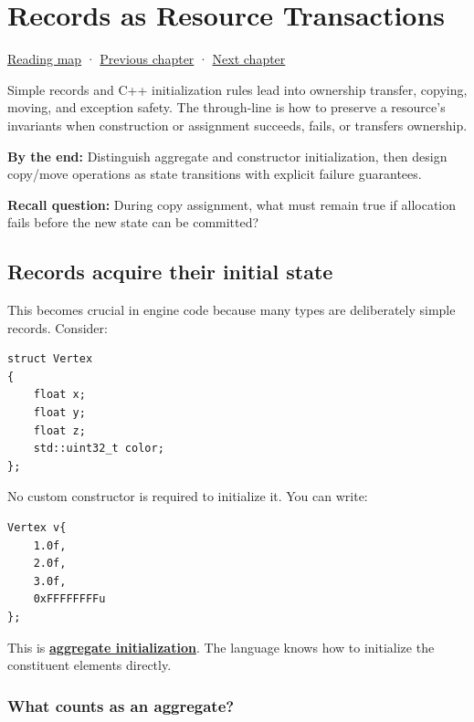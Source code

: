 \hypertarget{01-foundations-i-ch003}{}
\chapter{Records as Resource Transactions}\label{stagechapter:01-foundations-i-ch003}\label{01-foundations-i-ch003-records-as-resource-transactions}

\hyperref[volume-reading-map]{Reading map} · \hyperref[01-foundations-i-ch002-values-at-addresses-layout-lifetimes-and-representation]{Previous chapter} · \hyperref[01-foundations-i-ch004-prove-c-ownership-with-runnable-experiments]{Next chapter}

Simple records and C++ initialization rules lead into ownership transfer, copying, moving, and exception safety. The through-line is how to preserve a resource's invariants when construction or assignment succeeds, fails, or transfers ownership.

\textbf{By the end:} Distinguish aggregate and constructor initialization, then design copy/move operations as state transitions with explicit failure guarantees.

\textbf{Recall question:} During copy assignment, what must remain true if allocation fails before the new state can be committed?

\section{Records acquire their initial state}\label{01-foundations-i-ch003-records-acquire-their-initial-state}

This becomes crucial in engine code because many types are deliberately simple records. Consider:

\begin{verbatim}
struct Vertex
{
    float x;
    float y;
    float z;
    std::uint32_t color;
};
\end{verbatim}

No custom constructor is required to initialize it. You can write:

\begin{verbatim}
Vertex v{
    1.0f,
    2.0f,
    3.0f,
    0xFFFFFFFFu
};
\end{verbatim}

This is \textbf{\hyperref[appendix-b7174c179542]{aggregate initialization}}. The language knows how to initialize the constituent elements directly.

\subsection{What counts as an aggregate?}\label{01-foundations-i-ch003-what-counts-as-an-aggregate}

